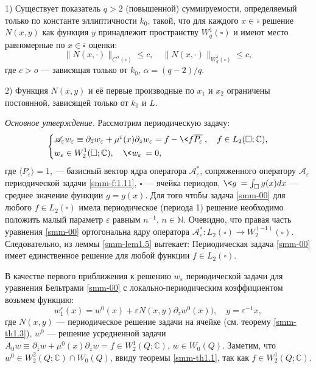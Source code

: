 	1) Существует показатель $q>2$ (повышенной) суммируемости, определяемый только по константе эллиптичности $k_0$, такой, что  для каждого $x\in\overline\square$ решение $N(x,y)$ как функция $y$ принадлежит пространству $W_q^1(\square)$ и имеют место равномерные по $x\in\overline\square$ оценки:
	$$
	\|N(x,\cdot)\|_{C^\alpha(\overline\square)}\leqslant c,\quad \|N(x,\cdot)\|_{W_q^1(\square)}\leqslant c,
	$$
	где $c>o$ --- зависящая только от $k_0$, $\alpha=(q-2)/q$.
	
	2) Функция $N(x,y)$ и её первые производные по $x_1$ и $x_2$ ограничены постоянной,
	зависящей только от $k_0$ и $L$.
	
	\textit{Основное утверждение.}
	Рассмотрим периодическую задачу:
	\begin{equation}\label{smm-00}
	\left\{\begin{aligned}
	&\mathscr{A}_\varepsilon w_\varepsilon\equiv \partial_{\bar{z}}w_\varepsilon +\mu^\varepsilon(x) \partial_{z}w_\varepsilon =f-\<f\overline{P_\varepsilon}\>,\quad f\in L_2(\square;\mathbb{C}),\\
	&w_\varepsilon\in W_2^1(\square;\mathbb{C}),	\quad \<w_\varepsilon\>=0,
	\end{aligned}\right.	
	\end{equation}
	   		где $\langle P_\varepsilon\rangle=1$, --- базисный вектор ядра оператора $\mathscr{A}_\varepsilon^\ast$, сопряженного оператору $\mathscr{A}_\varepsilon$ периодической задачи \eqref{smm-f:1.11}, $\square$ --- ячейка периодов, $\<g\>=\int_\square g(x)dx$ --- среднее значение функции  $g=g(x)$. Для того чтобы задача \eqref{smm-00} для любого $f\in L_2(\square)$ имела периодическое (периода 1) решение необходимо положить малый параметр $\varepsilon$ равным $n^{-1}$, $n\in \mathbb{N}$.
		Очевидно, что правая часть  уравнения  \eqref{smm-00} ортогональна ядру оператора $\mathscr{A}_\varepsilon^\ast:L_2 (\square)\to W_2^(-1) (\square)$. Следовательно, из леммы \ref{smm-lem1.5} вытекает: Периодическая задача \eqref{smm-00} имеет единственное решение для любой функции $f\in L_2(\square)$.
		
	
	В качестве первого приближения к решению $w_\varepsilon$  периодической задачи
	для уравнения Бельтрами \eqref{smm-00} с локально-периодическим коэффициентом возьмем функцию:
	$$ w_1^\varepsilon(x)=w^0(x)+\varepsilon N(x,y)\partial_zw^0(x)), \quad y=\varepsilon^{-1}x,$$
где $N(x,y)$  --- периодическое решение задачи на ячейке (см. теорему \ref{smm-th1.3}), $w^0$ --- решение усредненной задачи $A_0w\equiv\partial_{\overline{z}}w+\mu^0(x)\partial_zw=f\in W_2^1(Q;\mathbb{C})$, $w\in W_0(Q)$. Заметим, что $w^0\in W_2^2(Q;\mathbb{C})\cap W_0(Q)$, ввиду 	теоремы \ref{smm-th1.1}, так как $f\in W_2^1(Q;\mathbb{C})$.
	
